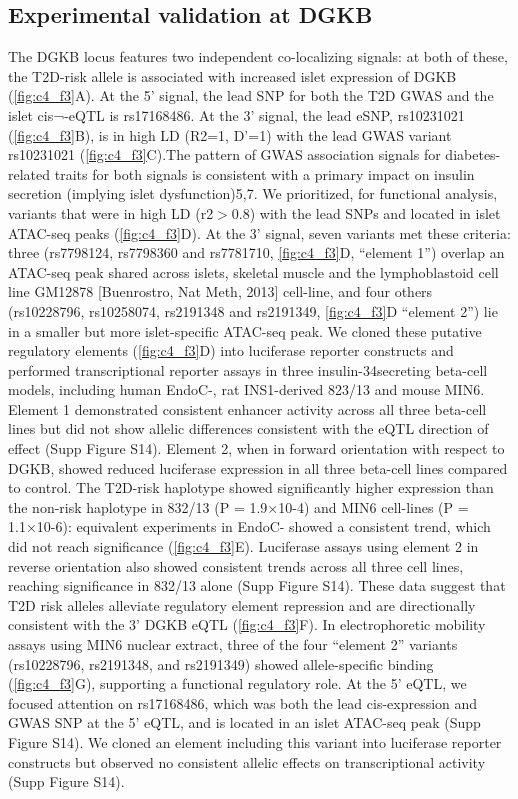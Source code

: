 \subsection{Experimental validation at DGKB}
The DGKB locus features two independent co-localizing signals: at both of these, the T2D-risk allele is associated with increased islet expression of DGKB (\ref{fig:c4_f3}A). At the 5’ signal, the lead SNP for both the T2D GWAS and the islet cis¬-eQTL is rs17168486. At the 3’ signal, the lead eSNP, rs10231021 (\ref{fig:c4_f3}B), is in high LD (R2=1, D’=1) with the lead GWAS variant rs10231021 (\ref{fig:c4_f3}C).The pattern of GWAS association signals for diabetes-related traits for both signals is consistent with a primary impact on insulin secretion (implying islet dysfunction)5,7.  We prioritized, for functional analysis, variants that were in high LD (r2$>$0.8) with the lead SNPs and located in islet ATAC-seq peaks (\ref{fig:c4_f3}D). 
At the 3’ signal, seven variants met these criteria: three (rs7798124, rs7798360 and rs7781710, \ref{fig:c4_f3}D, “element 1”) overlap an ATAC-seq peak shared across islets, skeletal muscle and the lymphoblastoid cell line GM12878 [Buenrostro, Nat Meth, 2013] cell-line, and four others (rs10228796, rs10258074, rs2191348 and rs2191349, \ref{fig:c4_f3}D “element 2”) lie in a smaller but more islet-specific ATAC-seq peak. We cloned these putative regulatory elements (\ref{fig:c4_f3}D) into luciferase reporter constructs and performed transcriptional reporter assays in three insulin-34secreting beta-cell models, including human EndoC-, rat INS1-derived 823/13 and mouse MIN6. Element 1 demonstrated consistent enhancer activity across all three beta-cell lines but did not show allelic differences consistent with the eQTL direction of effect (Supp Figure S14). Element 2, when in forward orientation with respect to DGKB, showed reduced luciferase expression in all three beta-cell lines compared to control. The T2D-risk haplotype showed significantly higher expression than the non-risk haplotype in 832/13 (P = 1.9×10-4) and MIN6 cell-lines (P = 1.1×10-6): equivalent experiments in EndoC- showed a consistent trend, which did not reach significance (\ref{fig:c4_f3}E). Luciferase assays using element 2 in reverse orientation also showed consistent trends across all three cell lines, reaching significance in 832/13 alone (Supp Figure S14). These data suggest that T2D risk alleles alleviate regulatory element repression and are directionally consistent with the 3’ DGKB eQTL (\ref{fig:c4_f3}F). In electrophoretic mobility assays using MIN6 nuclear extract, three of the four “element 2” variants (rs10228796, rs2191348, and rs2191349) showed allele-specific binding (\ref{fig:c4_f3}G), supporting a functional regulatory role. 
At the 5’ eQTL, we focused attention on rs17168486, which was both the lead cis-expression and GWAS SNP at the 5’ eQTL, and is located in an islet ATAC-seq peak (Supp Figure S14). We cloned an element including this variant into luciferase reporter constructs but observed no consistent allelic effects on transcriptional activity (Supp Figure S14). 

